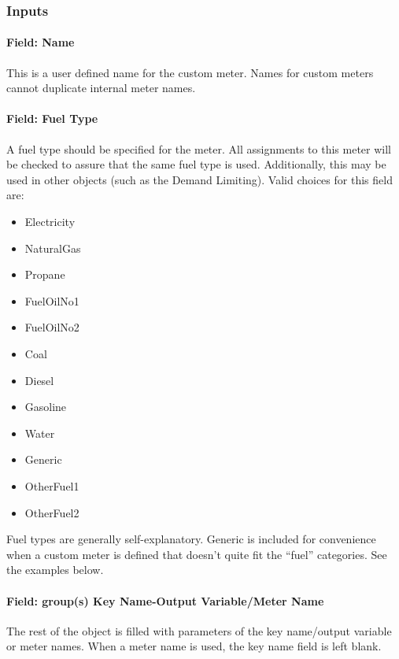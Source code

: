 \subsubsection{Inputs}\label{inputs-17-008}

\paragraph{Field: Name}\label{field-name-043}

This is a user defined name for the custom meter. Names for custom meters cannot duplicate internal meter names.

\paragraph{Field: Fuel Type}\label{field-fuel-type-004}

A fuel type should be specified for the meter. All assignments to this meter will be checked to assure that the same fuel type is used. Additionally, this may be used in other objects (such as the Demand Limiting). Valid choices for this field are:

\begin{itemize}
\item
  Electricity
\item
  NaturalGas
\item
  Propane
\item
  FuelOilNo1
\item
  FuelOilNo2
\item
  Coal
\item
  Diesel
\item
  Gasoline
\item
  Water
\item
  Generic
\item
  OtherFuel1
\item
  OtherFuel2
\end{itemize}

Fuel types are generally self-explanatory. Generic is included for convenience when a custom meter is defined that doesn't quite fit the ``fuel'' categories. See the examples below.

\paragraph{Field: group(s) Key Name-Output Variable/Meter Name}\label{field-groups-key-name-output-variablemeter-name}

The rest of the object is filled with parameters of the key name/output variable or meter names. When a meter name is used, the key name field is left blank.


